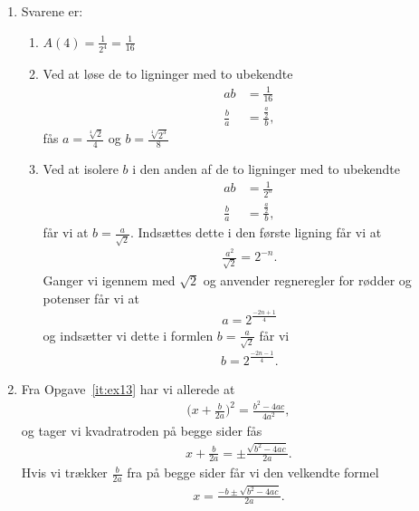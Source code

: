 \begin{enumerate}
\item Svarene er:
\begin{enumerate}
	\item $A(4)=\frac{1}{2^4}=\frac{1}{16}$
	\item Ved at løse de to ligninger med to ubekendte
	\begin{align*}
	ab&=\frac{1}{16}\\
	\frac{b}{a}&=\frac{\frac{a}{2}}{b},
	\end{align*}
	fås $ a=\frac{\sqrt[4]{2}}{4} $ og $ b= \frac{\sqrt[4]{2^3}}{8}$
	\item 	Ved at isolere $b$ i den anden af de to ligninger med to ubekendte
	\begin{align*}
	ab&=\frac{1}{2^n}\\
	\frac{b}{a}&=\frac{\frac{a}{2}}{b},
	\end{align*}
	får vi at $b=\frac{a}{\sqrt{2}}$. Indsættes dette i den første ligning får vi at 
	\begin{align*}
	\frac{a^2}{\sqrt{2}}=2^{-n}.
	\end{align*}
	Ganger vi igennem med $ \sqrt{2} $ og anvender regneregler for rødder og potenser får vi at
	\begin{align*}
	a=2^{\frac{-2n+1}{4}}
	\end{align*}
	og indsætter vi dette i formlen $b=\frac{a}{\sqrt{2}}$ får vi
	\begin{align*}
	b=2^{\frac{-2n-1}{4}}.
	\end{align*}
\end{enumerate}


\item Fra Opgave~\ref{it:ex13} har vi allerede at
\begin{align*}
\Big( x+\frac{b}{2a}\Big)^2=\frac{b^2-4ac}{4a^2},
\end{align*}
og tager vi kvadratroden på begge sider fås
\begin{align*}
x+\frac{b}{2a}=\pm\frac{\sqrt{b^2-4ac}}{2a}.
\end{align*}
Hvis vi trækker $ \frac{b}{2a} $ fra på begge sider får vi den velkendte formel
\begin{align*}
x=\frac{-b\pm \sqrt{b^2-4ac}}{2a}.
\end{align*}

\end{enumerate}
